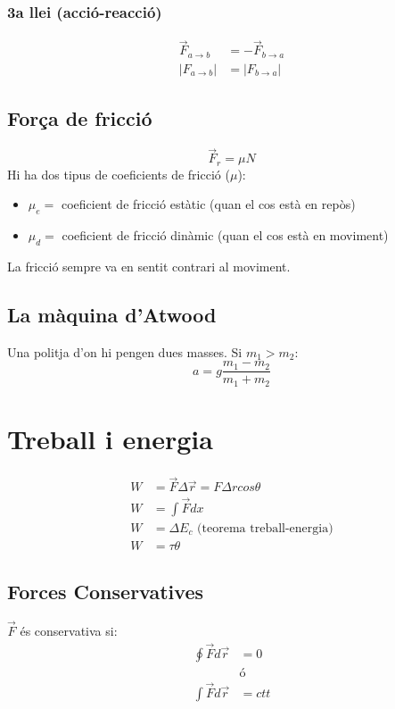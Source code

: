 \subsubsection{3a llei (acció-reacció)}
\begin{align*}
    \vec{F}_{a \rightarrow b} &= -\vec{F}_{b \rightarrow a} \\
    |F_{a \rightarrow b}| &= |F_{b \rightarrow a}|
\end{align*}

\subsection{Força de fricció}

\begin{equation}
    \vec{F}_r = \mu  N
\end{equation}
Hi ha dos tipus de coeficients de fricció ($\mu$):
\begin{itemize}
    \item $\mu _e = $ coeficient de fricció estàtic (quan el cos està en repòs)
    \item $\mu _d = $ coeficient de fricció dinàmic (quan el cos està en moviment)
\end{itemize}
La fricció sempre va en sentit contrari al moviment.


\subsection{La màquina d'Atwood}
Una politja d'on hi pengen dues masses. Si $m_1 > m_2$:
\begin{equation}
    a = g\frac{m_1-m_2}{m_1+m_2}
\end{equation} 

\section{Treball i energia}

\begin{align}
    W &= \vec{F}\Delta \vec{r} = F  \Delta r  cos\theta \\
    W &= \int \vec{F}dx \\
    W &= \Delta E_c \text{ (teorema treball-energia)} \\
    W &= \tau \theta
\end{align}

\subsection{Forces Conservatives}
$\vec{F}$ és conservativa si:
\begin{align*}
    \oint \vec{F}d\vec{r} &= 0 \\
    &\text{ó} \\
    \int \vec{F}d\vec{r} &= ctt
\end{align*}

